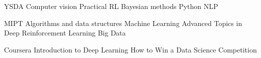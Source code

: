 

\begin{cvskills}

  \cvskill
  {YSDA} %
  {Computer vision {\cdotp} Practical RL {\cdotp} Bayesian methods {\cdotp} Python {\cdotp} NLP} %

  \cvskill
  {MIPT} %
  {Algorithms and data structures {\cdotp} Machine Learning {\cdotp} Advanced Topics in Deep Reinforcement Learning {\cdotp} Big Data} %

  \cvskill
  {Coursera} %
  {Introduction to Deep Learning {\cdotp} How to Win a Data Science Competition} %
\end{cvskills}

